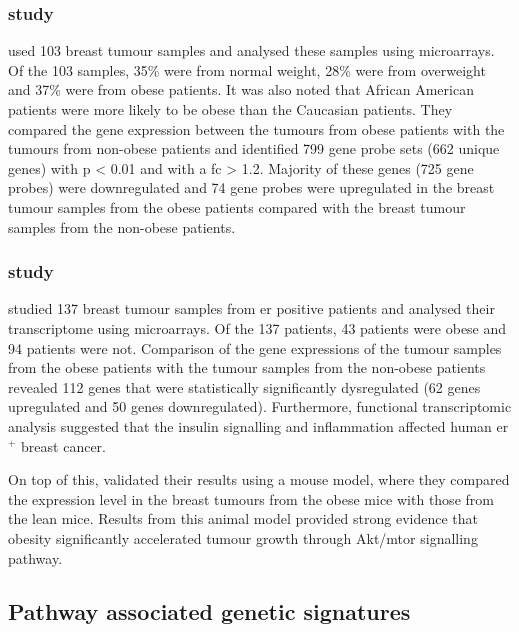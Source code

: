 \subsubsection{\citet{Creighton2012} study}
\label{ssub:creighton_study}

\citet{Creighton2012} used 103 breast tumour samples and analysed these samples using microarrays.
Of the 103 samples, 35\% were from normal weight, 28\% were from overweight and 37\% were from obese patients.
It was also noted that African American patients were more likely to be obese than the Caucasian patients.
They compared the gene expression between the tumours from obese patients with the tumours from non-obese patients and identified 799 gene probe sets (662 unique genes) with p \textless{} 0.01 and with a \gls{fc} \textgreater{} 1.2.
Majority of these genes (725 gene probes) were downregulated and 74 gene probes were upregulated in the breast tumour samples from the obese patients compared with the breast tumour samples from the non-obese patients.

\subsubsection{\citet{Fuentes-Mattei2014} study}
\label{ssub:fuentes_mattei_study}

\citet{Fuentes-Mattei2014} studied 137 breast tumour samples from \gls{er} positive patients and analysed their transcriptome using microarrays.
Of the 137 patients, 43 patients were obese and 94 patients were not.
Comparison of the gene expressions of the tumour samples from the obese patients with the tumour samples from the non-obese patients revealed 112 genes that were statistically significantly dysregulated (62 genes upregulated and 50 genes downregulated).
Furthermore, functional transcriptomic analysis suggested that the insulin signalling and inflammation affected human \gls{er}$^+$ breast cancer.

On top of this, \citet{Fuentes-Mattei2014} validated their results using a mouse model, where they compared the expression level in the breast tumours from the obese mice with those from the lean mice.
Results from this animal model provided strong evidence that obesity significantly accelerated tumour growth through Akt/\gls{mtor} signalling pathway.

\subsection{Pathway associated genetic signatures}
\label{sub:pathway_associated_genetic_signatures}

